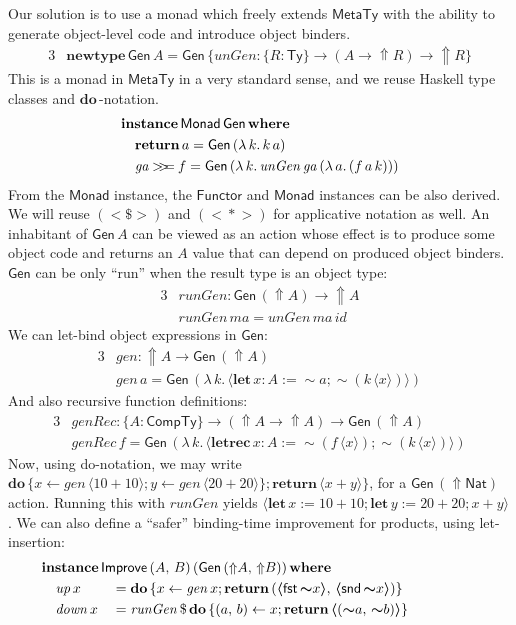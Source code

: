 \documentclass[acmsmall,screen,review,anonymous]{acmart}
\newcommand{\mit}[1]{\mathit{#1}}
\newcommand{\msf}[1]{\mathsf{#1}}
\newcommand{\mbf}[1]{\mathbf{#1}}
\newcommand{\bs}[1]{\boldsymbol{#1}}
\newcommand{\mdo}{\mbf{do}\,}
\newcommand{\ind}{\hspace{1em}}
\newcommand{\return}{\mbf{return}\,}
\newcommand{\lam}{\lambda\,}
\newcommand{\where}{\mbf{where}}
\newcommand{\letrec}{\mbf{letrec}\,}
\newcommand{\letdef}{\mbf{let\,}}
\newcommand{\vma}{\mit{ma}}
\newcommand{\Monad}{\msf{Monad}}
\newcommand{\Applicative}{\msf{Monad}}
\newcommand{\Functor}{\msf{Functor}}
\newcommand{\fro}{\leftarrow}
\newcommand{\Up}{{\Uparrow}}
\newcommand{\spl}{{\bs{\sim}}}
\newcommand{\ql}{{\bs{\langle}}}
\newcommand{\qr}{{\bs{\rangle}}}
\newcommand{\bind}{\mathbin{>\!\!>\mkern-6.7mu=}}
\newcommand{\MTy}{\msf{MetaTy}}
\newcommand{\Ty}{\msf{Ty}}
\newcommand{\CTy}{\msf{CompTy}}
\newcommand{\fst}{\msf{fst}}
\newcommand{\snd}{\msf{snd}}
\newcommand{\Nat}{\msf{Nat}}
\theoremstyle{remark}
\newcommand{\id}{\mit{id}}
\newcommand{\mup}{\mit{up}}
\newcommand{\mdown}{\mit{down}}
\newcommand{\instance}{\mbf{instance}\,}
\newcommand{\Improve}{\msf{Improve}}
\newcommand{\Gen}{\msf{Gen}}
\newcommand{\unGen}{\mit{unGen}}
\newcommand{\gen}{\mit{gen}}
\newcommand{\genRec}{\mit{genRec}}
\newcommand{\fmap}{<\!\!\$\!\!>}
\newcommand{\ap}{<\!\!*\!\!>}
\newcommand{\runGen}{\mit{runGen}}
\newcommand{\qt}[1]{\ql#1\qr}
\newcommand{\newtype}{\mbf{newtype}\,}
\begin{document}
Our solution is to use a monad which freely extends $\MTy$ with the ability to
generate object-level code and introduce object binders.
\begin{alignat*}{3}
  & \newtype \Gen\,A = \Gen\,\{\unGen : \{R : \Ty\} \to (A \to \Up R) \to \Up R\}
\end{alignat*}
This is a monad in $\MTy$ in a very standard sense, and we reuse Haskell type classes
and $\mdo$-notation.
\begin{alignat*}{3}
  &\instance \Monad\,\Gen\,\where\\
  &\ind \return a = \Gen\,(\lam k.\,k\,a)\\
  &\ind \mit{ga} \bind f = \Gen\,(\lam k.\,\unGen\,\mit{ga}\,(\lam a.\,(f\,a\,k)))
\end{alignat*}
From the $\Monad$ instance, the $\Functor$ and $\Applicative$ instances can be also derived.
We will reuse $(\fmap)$ and $(\ap)$ for applicative notation
as well.
An inhabitant of $\Gen\,A$ can be viewed as an action whose effect is to produce
some object code and returns an $A$ value that can depend on produced object
binders. $\Gen$ can be only ``run'' when the result type is an object type:
\begin{alignat*}{3}
  &\runGen : \Gen\,(\Up A) \to \Up A\\
  &\runGen\,\vma = \unGen\,\vma\,\id
\end{alignat*}
We can let-bind object expressions in $\Gen$:
\begin{alignat*}{3}
  & \gen : \Up A \to \Gen\,(\Up A) \\
  & \gen\,a = \Gen\,(\lam k.\,\ql \letdef x : A := \spl a; \spl(k\,\ql x \qr) \qr)
\end{alignat*}
And also recursive function definitions:
\begin{alignat*}{3}
  & \genRec : \{A : \CTy\} \to (\Up A \to \Up A) \to \Gen\,(\Up A) \\
  & \genRec\,f = \Gen\,(\lam k.\,\qt{\letrec x : A := \spl(f\,\qt{x}); \spl(k\,\qt{x})})
\end{alignat*}
Now, using do-notation, we may write $\mdo \{x \fro \gen\,\qt{10 + 10}; y \fro
\gen\,\qt{20 + 20}\};\return \qt{x + y}\}$, for a $\Gen\,(\Up \Nat)$
action. Running this with $\runGen$ yields $\qt{\letdef x := 10 + 10; \letdef y
  := 20 + 20; x + y}$. We can also define a ``safer'' binding-time improvement for
products, using let-insertion:
\begin{alignat*}{3}
  &\hspace{-4em}\mathrlap{\instance \Improve\,(A,\,B)\,(\Gen\,(\Up A,\,\Up B))\,\where}\\
  &\hspace{-4em}\ind \mup\,x   && = \mdo\{x \fro \gen\,x; \return (\qt{\fst\,\spl x},\,\qt{\snd\,\spl x})\}\\
  &\hspace{-4em}\ind \mdown\,x && = \runGen\,\$\,\mdo \{(a,\,b) \fro x; \return \qt{(\spl a,\, \spl b)}\}
\end{alignat*}
\end{document}
